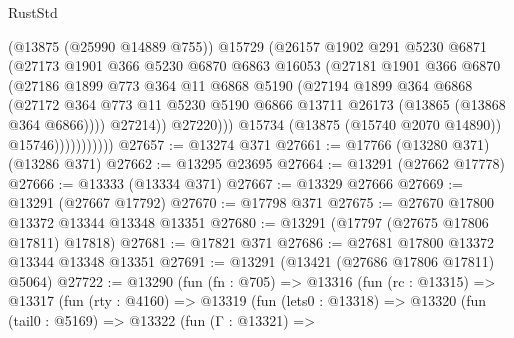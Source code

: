 \begin{lexlean}{RustStd}
\begin{coremodule}
                            (@13875 (@25990 @14889 @755))
                            @15729
                            (@26157
                              @1902
                              @291
                              @5230
                              @6871
                              (@27173
                                @1901
                                @366
                                @5230
                                @6870
                                @6863
                                @16053
                                (@27181
                                  @1901
                                  @366
                                  @6870
                                  (@27186
                                    @1899
                                    @773
                                    @364
                                    @11
                                    @6868
                                    @5190
                                    (@27194
                                      @1899
                                      @364
                                      @6868
                                      (@27172
                                        @364
                                        @773
                                        @11
                                        @5230
                                        @5190
                                        @6866
                                        @13711
                                        @26173
                                        (@13865 (@13868 @364 @6866))))
                                    @27214))
                                @27220)))
                          @15734
                          (@13875 (@15740 @2070 @14890))
                          @15746)))))))))))
@27657 := @13274 @371
@27661 := @17766 (@13280 @371) (@13286 @371)
@27662 := @13295 @23695
@27664 := @13291 (@27662 @17778)
@27666 := @13333 (@13334 @371)
@27667 := @13329 @27666
@27669 := @13291 (@27667 @17792)
@27670 := @17798 @371
@27675 := @27670 @17800 @13372 @13344 @13348 @13351
@27680 := @13291 (@17797 (@27675 @17806 @17811) @17818)
@27681 := @17821 @371
@27686 := @27681 @17800 @13372 @13344 @13348 @13351
@27691 := @13291 (@13421 (@27686 @17806 @17811) @5064)
@27722 := @13290
    (fun (fn : @705) =>
    @13316
      (fun (rc : @13315) =>
      @13317
        (fun (rty : @4160) =>
        @13319
          (fun (lets0 : @13318) =>
          @13320
            (fun (tail0 : @5169) =>
            @13322
              (fun (Γ : @13321) =>

\end{coremodule}
\end{lexlean}
